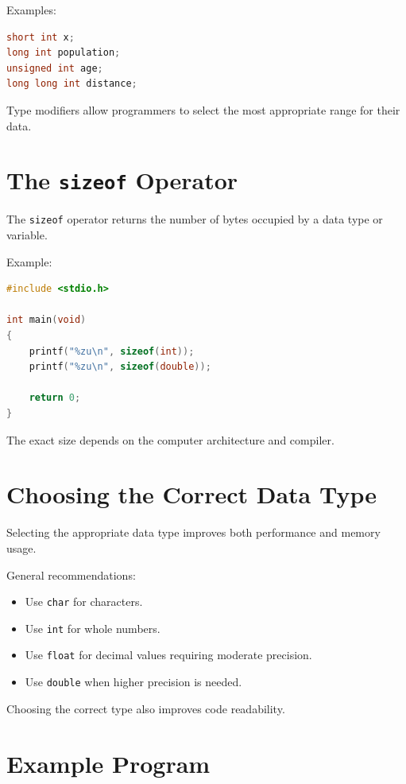 \documentclass[12pt,openany]{book}
\begin{document}
Examples:

\begin{lstlisting}[language=C]
short int x;
long int population;
unsigned int age;
long long int distance;
\end{lstlisting}

Type modifiers allow programmers to select the most appropriate range for their data.

\section{The \texttt{sizeof} Operator}

The \texttt{sizeof} operator returns the number of bytes occupied by a data type or variable.

Example:

\begin{lstlisting}[language=C]
#include <stdio.h>

int main(void)
{
    printf("%zu\n", sizeof(int));
    printf("%zu\n", sizeof(double));

    return 0;
}
\end{lstlisting}

The exact size depends on the computer architecture and compiler.

\section{Choosing the Correct Data Type}

Selecting the appropriate data type improves both performance and memory usage.

General recommendations:

\begin{itemize}
    \item Use \texttt{char} for characters.
    \item Use \texttt{int} for whole numbers.
    \item Use \texttt{float} for decimal values requiring moderate precision.
    \item Use \texttt{double} when higher precision is needed.
\end{itemize}

Choosing the correct type also improves code readability.

\section{Example Program}
\end{document}
